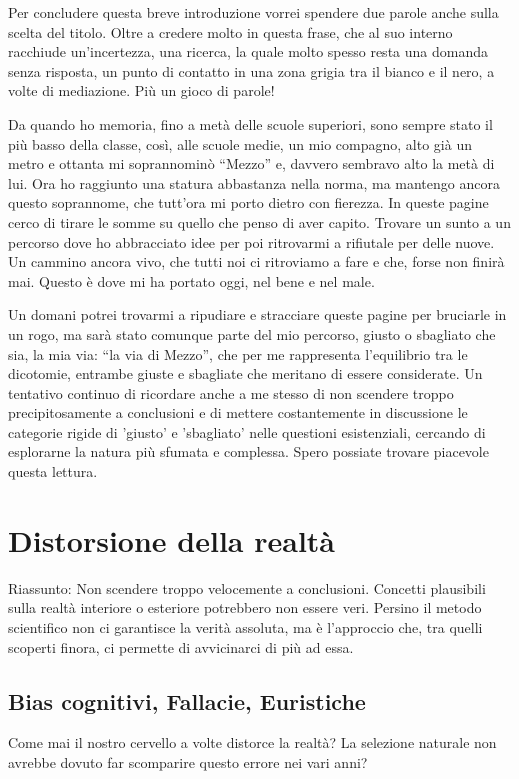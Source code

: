 \documentclass[12pt]{book} %
\begin{document}
Per concludere questa breve introduzione vorrei spendere due parole anche sulla scelta del titolo. Oltre a credere molto
in questa frase, che al suo interno racchiude un'incertezza, una ricerca, la quale molto spesso
resta una domanda senza risposta, un punto di contatto in una zona grigia tra il bianco e il nero, a volte di
mediazione. Più un gioco di parole!

Da quando ho memoria, fino a metà delle scuole superiori, sono sempre stato il più basso della classe, così, alle scuole
medie, un mio compagno, alto già un metro e ottanta mi soprannominò “Mezzo” e, davvero sembravo alto la metà di lui.
Ora ho raggiunto una statura abbastanza nella norma, ma mantengo ancora questo soprannome, che
tutt'ora mi porto dietro con fierezza. In queste pagine cerco di tirare le somme su quello che
penso di aver capito. Trovare un sunto a un percorso dove ho abbracciato idee per poi ritrovarmi a rifiutale per delle
nuove. Un cammino ancora vivo, che tutti noi ci ritroviamo a fare e che, forse non finirà mai. Questo è dove mi ha portato oggi, nel bene e nel male.

Un domani potrei trovarmi a ripudiare e stracciare queste pagine per bruciarle in un rogo, ma sarà stato comunque parte
del mio percorso, giusto o sbagliato che sia, la mia via: “la via di Mezzo”, che per me rappresenta l'equilibrio tra le dicotomie, entrambe giuste e sbagliate che meritano di essere considerate. Un tentativo continuo di ricordare anche a me stesso di non scendere troppo precipitosamente a conclusioni e di mettere costantemente in discussione le categorie rigide di 'giusto' e 'sbagliato' nelle questioni esistenziali, cercando di esplorarne la natura più sfumata e complessa.
Spero possiate trovare piacevole questa lettura.

\clearpage\section{Distorsione della realtà}
\begin{mdframed}[linewidth=1pt]
Riassunto: Non scendere troppo velocemente a conclusioni. Concetti plausibili sulla realtà interiore o esteriore potrebbero non essere veri. Persino il metodo scientifico non ci garantisce la verità assoluta, ma è l'approccio che, tra quelli scoperti finora, ci permette di avvicinarci di più ad essa.
\end{mdframed}

\subsection{Bias cognitivi, Fallacie, Euristiche}
Come mai il nostro cervello a volte distorce la realtà? La selezione naturale non avrebbe
dovuto far scomparire questo errore nei vari anni?
\end{document}
